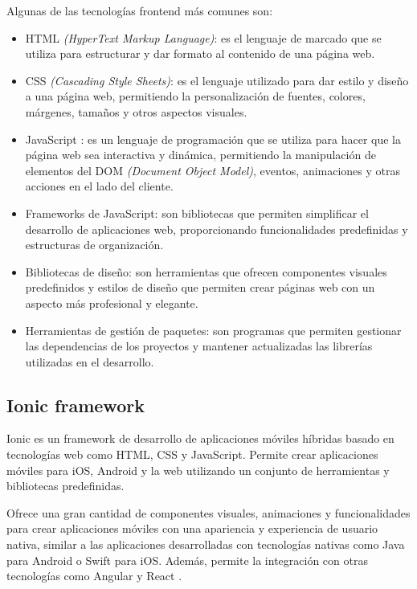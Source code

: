 Algunas de las tecnologías frontend más comunes son:
\begin{itemize}
	\item HTML \cite{WEBSITE:HTML} \textit{(HyperText Markup Language)}: es el lenguaje de marcado que se utiliza para estructurar y dar formato al contenido de una página web.
	\item CSS \cite{WEBSITE:css} \textit{(Cascading Style Sheets)}: es el lenguaje utilizado para dar estilo y diseño a una página web, permitiendo la personalización de fuentes, colores, márgenes, tamaños y otros aspectos visuales.
	\item JavaScript \cite{WEBSITE:javascript}: es un lenguaje de programación que se utiliza para hacer que la página web sea interactiva y dinámica, permitiendo la manipulación de elementos del DOM \cite{WEBSITE:DOM} \textit{(Document Object Model)}, eventos, animaciones y otras acciones en el lado del cliente.
	\item Frameworks de JavaScript: son bibliotecas que permiten simplificar el desarrollo de aplicaciones web, proporcionando funcionalidades predefinidas y estructuras de organización.
	\item Bibliotecas de diseño: son herramientas que ofrecen componentes visuales predefinidos y estilos de diseño que permiten crear páginas web con un aspecto más profesional y elegante.
	\item Herramientas de gestión de paquetes: son programas que permiten gestionar las dependencias de los proyectos y mantener actualizadas las librerías utilizadas en el desarrollo.	
\end{itemize}

\subsection{Ionic framework}
\label{subsec:ionic}

Ionic \cite{WEBSITE:ionic} es un framework de desarrollo de aplicaciones móviles híbridas basado en tecnologías web como HTML, CSS y JavaScript. Permite crear aplicaciones móviles para iOS, Android y la web utilizando un conjunto de herramientas y bibliotecas predefinidas.

Ofrece una gran cantidad de componentes visuales, animaciones y funcionalidades para crear aplicaciones móviles con una apariencia y experiencia de usuario nativa, similar a las aplicaciones desarrolladas con tecnologías nativas como Java para Android o Swift para iOS. Además, permite la integración con otras tecnologías como Angular \cite{WEBSITE:angular} y React \cite{WEBSITE:react}.

